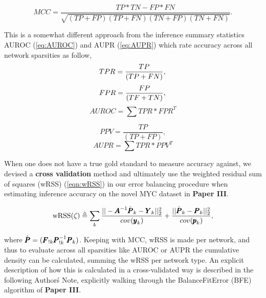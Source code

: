 \begin{equation}\label{eq:MCC}
MCC=\frac{TP*TN-FP*FN}{\sqrt{(TP+FP)(TP+FN)(TN+FP)(TN+FN)}}.
\end{equation}

This is a somewhat different approach from the inference summary statistics AUROC (\cref{eq:AUROC}) and AUPR (\cref{eq:AUPR}) which rate accuracy across all network sparsities as follow,
\begin{equation}\label{eq:TPR}
TPR=\frac{TP}{(TP+FN)},\\ \end{equation}
\begin{equation}\label{eq:FPR}
FPR=\frac{FP}{(TF+TN)},\\ \end{equation}
\begin{equation}\label{eq:AUROC}
AUROC=\sum{TPR*FPR^T}
\end{equation}

\begin{equation}\label{eq:PPV} 
PPV=\frac{TP}{(TP+FP)},\end{equation}
\begin{equation}\label{eq:AUPR}
AUPR=\sum{TPR*PPV^T}
\end{equation}


When one does not have a true gold standard to measure accuracy against, we devised a \textbf{cross validation} method and ultimately use the weighted residual sum of squares (wRSS) (\cref{eqn:wRSS}) in our error balancing procedure when estimating inference accuracy on the novel MYC dataset in \textbf{Paper III}.

\begin{equation}\label{eqn:wRSS}
  \textrm{wRSS}(\zeta) \triangleq \sum_k \frac{||-{\pmb{A}}^{-1}\hat{{\pmb{P}}}_k-{\pmb{Y}}_k||^2_2}{cov({\pmb{y}}_k)}+\frac{||\hat{{\pmb{P}}}_k-{\pmb{P}}_k||^2_2}{cov({\pmb{p}}_k)},
\end{equation}

where $\hat{{\pmb{P}}}=({\pmb{F}}_{!k}{\pmb{P}}^{-1}_{!k}{\pmb{P}}_k)$. Keeping with MCC, wRSS is made per network, and thus to evaluate across all sparsities like AUROC or AUPR the cumulative density can be calculated, summing the wRSS per network type. An explicit description of how this is calculated in a cross-validated way is described in the following Author\'s Note, explicitly walking through the BalanceFitError (BFE) algorithm of \textbf{Paper III}.\\

